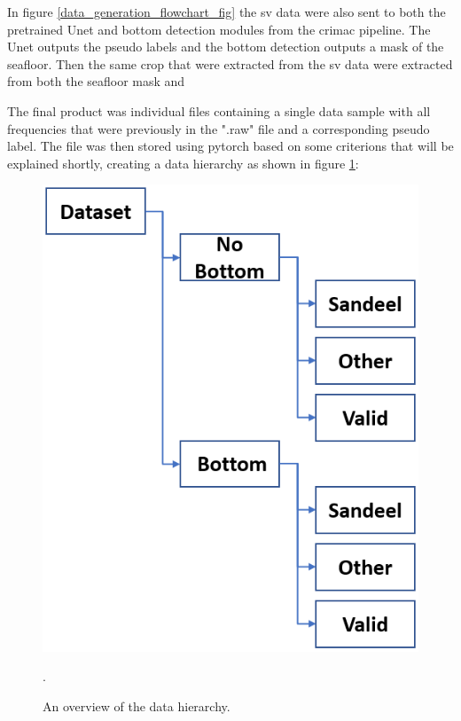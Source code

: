         In figure \ref{data_generation_flowchart_fig} the  \gls{sv} data were also sent to both the pretrained Unet and bottom detection modules from the \gls{crimac} pipeline. The Unet outputs the pseudo labels and the bottom detection outputs a mask of the seafloor. Then the same crop that were extracted from the \gls{sv} data were extracted from both the seafloor mask and 
        
        
        
        
        
        The final product was individual files containing a single data sample with all frequencies that were previously in the ".raw" file and a corresponding pseudo label. The file was then stored using pytorch based on some criterions that will be explained shortly, creating a data hierarchy as shown in figure \ref{data_hierarchy_fig}:
        
        \begin{figure}[H]
            \centering
            \includegraphics[scale=0.5]{figures/data_hierarki.png}
            \caption{An overview of the data hierarchy.}.
          	\medskip 
            \label{data_hierarchy_fig}
        \end{figure}
        
